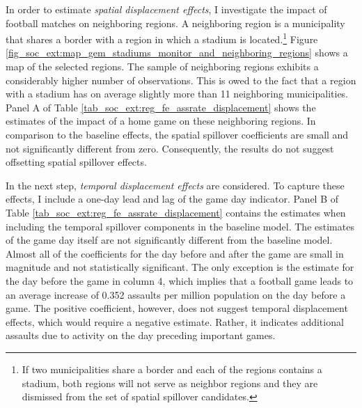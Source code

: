 In order to estimate \textit{spatial displacement effects}, I investigate the impact of football matches on neighboring regions. A neighboring region is a municipality that shares a border with a region in which a stadium is located.\footnote{If two municipalities share a border and each of the regions contains a stadium, both regions will not serve as neighbor regions and they are dismissed from the set of spatial spillover candidates.} Figure \ref{fig_soc_ext:map_gem_stadiums_monitor_and_neighboring_regions} shows a map of the selected regions. The sample of neighboring regions exhibits a considerably higher number of observations. This is owed to the fact that a region with a stadium has on average slightly more than 11 neighboring municipalities. Panel A of Table \ref{tab_soc_ext:reg_fe_assrate_displacement} shows the estimates of the impact of a home game on these neighboring regions. In comparison to the baseline effects, the spatial spillover coefficients are small and not significantly different from zero. Consequently, the results do not suggest offsetting spatial spillover effects.

In the next step, \textit{temporal displacement effects} are considered. To capture these effects, I include a one-day lead and lag of the game day indicator. Panel B of Table \ref{tab_soc_ext:reg_fe_assrate_displacement} contains the estimates when including the temporal spillover components in the baseline model. The estimates of the game day itself are not significantly different from the baseline model. Almost all of the coefficients for the day before and after the game are small in magnitude and not statistically significant. The only exception is the estimate for the day before the game in column 4, which implies that a football game leads to an average increase of 0.352 assaults per million population on the day before a game. The positive coefficient, however, does not suggest temporal displacement effects, which would require a negative estimate. Rather, it indicates additional assaults due to activity on the day preceding important games. 



